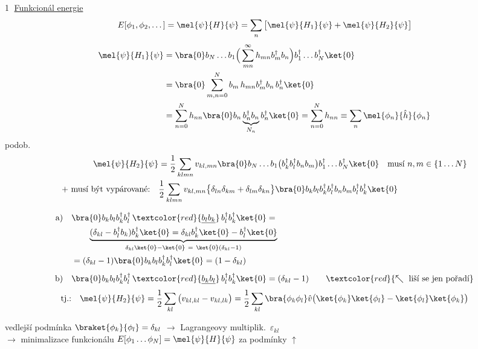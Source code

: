 \textcircled{1} \underline{Funkcionál energie}
\[
  E[\phi_1,\phi_2,\dots] = \mel{\psi}{H}{\psi} = \sum_n\big[\mel{\psi}{H_1}{\psi} + \mel{\psi}{H_2}{\psi}\big]
\]
\begin{align*}
  \mel{\psi}{H_1}{\psi} &= \bra{0}b_N\dots b_1\Big(\sum_{mn}^{\infty}h_{mn}b_m^\dagger b_n\Big)b_1^\dagger\dots b_N^\dagger\ket{0} \\
  &= \bra{0}\sum_{m,n=0}^{N}b_m\,h_{mn}b_m^\dagger b_n\,b_n^\dagger\ket{0} \\
  &= \sum_{n=0}^{N}h_{nn}\bra{0}b_n\underbrace{b_n^\dagger b_n}_{N_n}b_n^\dagger\ket{0} = \sum_{n=0}^{N}h_{nn} \equiv \sum_n\mel{\phi_n}{\hat h}{\phi_n}
\end{align*}
podob.
\begin{align*}
  \mel{\psi}{H_2}{\psi} &= \frac12\sum_{klmn}v_{kl,mn}\bra{0}b_N\dots b_1\big(b_k^\dagger b_l^\dagger b_nb_m\big)b_1^\dagger\dots b_N^\dagger\ket{0}
  \quad\text{musí } n,m\in\{1\dots N\} \\
  \text{+ musí být vypárované:}\quad
  &\frac12\sum_{klmn}v_{kl,mn}\big\{\delta_{ln}\delta_{km} + \delta_{lm}\delta_{kn}\big\}\bra{0}b_kb_lb_k^\dagger b_l^\dagger b_nb_mb_l^\dagger b_k^\dagger\ket{0}
\end{align*}

\begin{align*}
  \text{a)}\quad &\bra{0}b_kb_lb_k^\dagger b_l^\dagger\,\textcolor{red}{\underline{b_lb_k}}\,b_l^\dagger b_k^\dagger\ket{0} = \\
  &\qquad \underbrace{(\delta_{kl} - b_l^\dagger b_k)b_k^\dagger\ket{0} = \delta_{kl}b_k^\dagger\ket{0} - b_l^\dagger\ket{0}}_{\delta_{kl}\ket{0} - \ket{0}\ =\ \ket{0}(\delta_{kl} - 1)} \\
  &= (\delta_{kl} - 1)\bra{0}b_kb_lb_k^\dagger b_l^\dagger\ket{0} = (1 - \delta_{kl}) \\[4pt]
  \text{b)}\quad &\bra{0}b_kb_lb_k^\dagger b_l^\dagger\,\textcolor{red}{\underline{b_kb_l}}\,b_l^\dagger b_k^\dagger\ket{0} = (\delta_{kl} - 1)
  \qquad \textcolor{red}{\nwarrow\ \text{liší se jen pořadí}}
\end{align*}
\[
  \text{tj.:}\quad \mel{\psi}{H_2}{\psi} = \frac12\sum_{kl}\big(v_{kl,kl} - v_{kl,lk}\big)
  = \frac12\sum_{kl}\bra{\phi_k\phi_l}\hat v\big(\ket{\phi_k}\ket{\phi_l} - \ket{\phi_l}\ket{\phi_k}\big)
\]

vedlejší podmínka $\braket{\phi_k}{\phi_l} = \delta_{kl}$ \quad $\to$ Lagrangeovy multiplik.\ $\varepsilon_{kl}$ \\
$\to$ minimalizace funkcionálu $E[\phi_1\dots\phi_N] = \mel{\psi}{H}{\psi}$ za podmínky $\uparrow$

